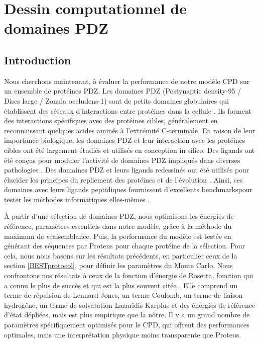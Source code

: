 \chapter{Dessin computationnel de domaines PDZ}
\label{chap:PDZ}

\section{Introduction}

Nous cherchons maintenant, à évaluer la performance de notre modèle CPD sur un ensemble de protéines PDZ. Les domaines PDZ (\og Postynaptic density-95 / Discs large / Zonula occludens-1\fg) sont de petits domaines globulaires qui établissent des réseaux d'interactions entre protéines dans la cellule \citep{Harris01,Hung02,Tonikian08,Gfeller11,Subbaiah11}. Ils forment des interactions spécifiques avec des protéines cibles, généralement en reconnaissant quelques acides aminés à l'extrémité C-terminale. En raison de leur importance biologique, les domaines PDZ et leur interaction avec les protéines cibles ont été largement étudiés et utilisés en conception in silico. Des ligands ont été conçus  pour moduler l'activité de domaines PDZ impliqués dans diverses pathologies \citep{Roberts12,Zheng15}. Des domaines  PDZ et leurs  ligands redessinés ont été utilisés pour élucider les principes du repliement des protéines et de l'évolution \cite{Kong09,Mclaughlin12,Melero14}. Ainsi, ces domaines avec leurs ligands peptidiques fournissent d'excellents \og benchmarks\fg pour tester les méthodes informatiques elles-mêmes \cite{Reina02,Smith10}.

À partir d'une sélection de domaines PDZ, nous optimisons les énergies de référence, paramètres essentiels dans notre modèle, grâce à la méthode du maximum de vraisemblance. Puis, la performance du modèle est testée en générant des séquences par Proteus pour chaque protéine de la sélection. Pour cela, nous nous basons sur les résultats précédents, en particulier ceux de la section \ref{BESTprotocol}, pour définir les paramètres du Monte Carlo. Nous confrontons nos résultats à ceux de la fonction d'énergie de Rosetta, fonction qui a connu le plus de succès et qui est la plus souvent citée \cite{Baker06}. Elle comprend un terme de répulsion de Lennard-Jones, un terme Coulomb, un terme de liaison hydrogène, un terme de solvatation Lazaridis-Karplus et des énergies de référence d'état dépliées, mais est plus empirique que la nôtre. Il y a un grand nombre de paramètres spécifiquement optimisés pour le CPD, qui offrent des performances optimales, mais une interprétation physique moins transparente que Proteus.
   
